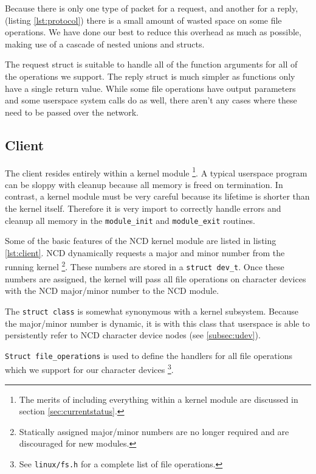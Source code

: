 \documentclass[11pt,twocolumn]{article}
\begin{document}
Because there is only one type of packet for a request, and another for
a reply, (listing \ref{lst:protocol}) there is a small amount of wasted
space on some file operations. We have done our best to reduce this
overhead as much as possible, making use of a cascade of nested unions
and structs.

The request struct is suitable to handle all of the function arguments
for all of the operations we support. The reply struct is much simpler
as functions only have a single return value. While some file operations
have output parameters and some userspace system calls do as well, there
aren't any cases where these need to be passed over the network.

\subsection{Client}



The client resides entirely within a kernel module \footnote{The merits
of including everything within a kernel module are discussed in section
\ref{sec:currentstatus}.}. A typical userspace program can be sloppy
with cleanup because all memory is freed on termination. In contrast, a
kernel module must be very careful because its lifetime is shorter than
the kernel itself. Therefore it is very import to correctly handle
errors and cleanup all memory in the \texttt{module\_init} and
\texttt{module\_exit} routines.

Some of the basic features of the NCD kernel module are listed in
listing \ref{lst:client}. NCD dynamically requests a major and
minor number from the running kernel \footnote{Statically assigned
major/minor numbers are no longer required and are discouraged for new
modules.}. These numbers are stored in a \texttt{struct dev\_t}. Once
these numbers are assigned, the kernel will pass all file operations on
character devices with the NCD major/minor number to the NCD module.

The \texttt{struct class} is somewhat synonymous with a kernel
subsystem. Because the major/minor number is dynamic, it is with this
class that userspace is able to persistently refer to NCD character
device nodes (see \ref{subsec:udev}).

\texttt{Struct file\_operations} is used to define the handlers for all
file operations which we support for our character devices \footnote{See
\texttt{linux/fs.h} for a complete list of file operations.}.
\end{document}
